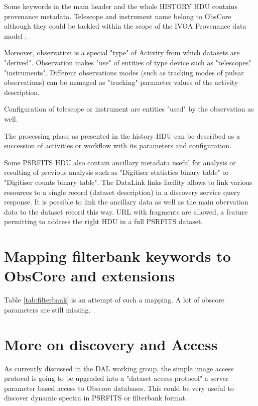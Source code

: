 \documentclass[11pt,a4paper]{ivoa}
\begin{document}
 Some keywords in the main header and the whole HISTORY HDU contains provenance metadata. Telescope and instrument name belong to ObsCore although they could be tackled within the scope of the IVOA Provenance data model \citep{2020ivoa.spec.0411S}.
 
 Moreover, observation is a special "type" of Activity from which datasets are "derived". Observation makes "use" of entities of type device such as "telescopes" "instruments". Different observations modes (such as tracking modes of pulsar observations) can be managed as "tracking" parameter values of the activity description. 
 
 Configuration of telescope or instrument are entities "used" by the observation as well.
 
 The processing phase as presented in the  history HDU can be described as a succession of activities or workflow with its parameters and configuration. 
 
 Some PSRFITS HDU also contain ancillary metadata useful for analysis or resulting of previous analysis such as "Digitiser statistics binary table" or "Digitiser counts binary table".  The DataLink \citep{2015ivoa.spec.0617D} {links} facility allows to link various resources to a single record (dataset description) in a discovery service query response. It is possible to link the ancillary data as well as the main obervation data to the dataset record this way. URL with fragments are allowed, a feature permitting to address the right HDU in a full PSRFITS dataset. 
 
 \section{Mapping filterbank keywords to ObsCore and extensions}
 
 Table \ref{tab:filterbank} is an attempt of such a mapping. A lot of obscore parameters are still missing.  
 
 \section{More on discovery and Access}
 
 As currently discussed in the DAL working group, the simple image access protocol \citep{std:SIAV2} is going to be upgraded into a "dataset access protocol" a server parameter based access to Obscore databases. This could be very useful to discover dynamic spectra in PSRFITS or filterbank format.
 
\end{document}

